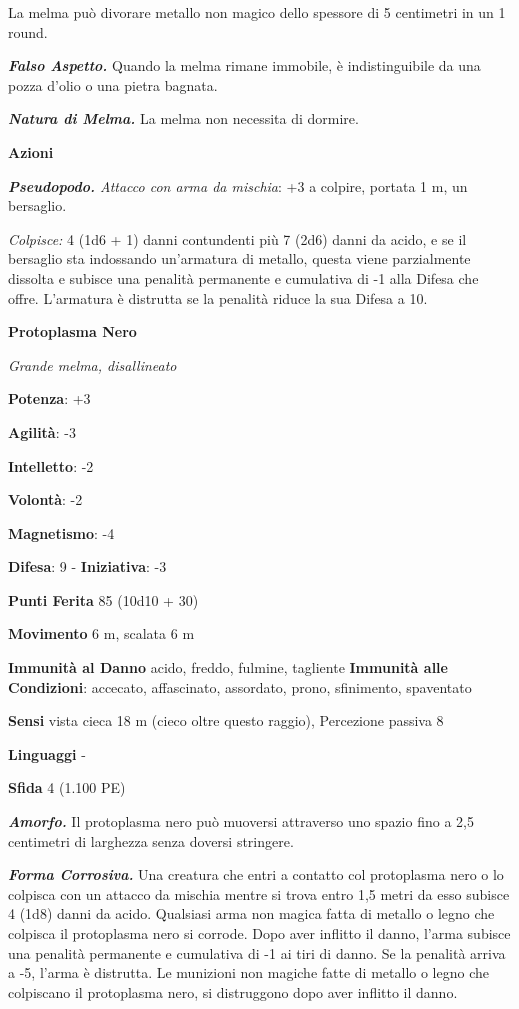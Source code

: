 \begin{multicols}{2}
La melma può divorare metallo non magico dello spessore di 5 centimetri
in un 1 round.

\emph{\textbf{Falso Aspetto.}} Quando la melma rimane immobile, è
indistinguibile da una pozza d'olio o una pietra bagnata.

\emph{\textbf{Natura di Melma.}} La melma non necessita di dormire.

\smallskip\textbf{Azioni}

\emph{\textbf{Pseudopodo.} Attacco con arma da mischia}: +3 a colpire,
portata 1 m, un bersaglio.

\emph{Colpisce:} 4 (1d6 + 1) danni contundenti più 7 (2d6) danni da
acido, e se il bersaglio sta indossando un'armatura di metallo, questa
viene parzialmente dissolta e subisce una penalità permanente e
cumulativa di -1 alla Difesa che offre. L'armatura è distrutta se la
penalità riduce la sua Difesa a 10.



\textbf{Protoplasma Nero}

\emph{Grande melma, disallineato}

\textbf{Potenza}: +3

\textbf{Agilità}: -3

\textbf{Intelletto}: -2

\textbf{Volontà}: -2

\textbf{Magnetismo}: -4

\textbf{Difesa}: 9 - \textbf{Iniziativa}: -3

\textbf{Punti Ferita} 85 (10d10 + 30)

\textbf{Movimento} 6 m, scalata 6 m

\textbf{Immunità al Danno} acido, freddo, fulmine, tagliente
\textbf{Immunità alle Condizioni}: accecato, affascinato, assordato,
prono, sfinimento, spaventato

\textbf{Sensi} vista cieca 18 m (cieco oltre questo raggio), Percezione
passiva 8

\textbf{Linguaggi} -

\textbf{Sfida} 4 (1.100 PE)\smallskip

\emph{\textbf{Amorfo.}} Il protoplasma nero può muoversi attraverso uno
spazio fino a 2,5 centimetri di larghezza senza doversi stringere.

\emph{\textbf{Forma Corrosiva.}} Una creatura che entri a contatto col
protoplasma nero o lo colpisca con un attacco da mischia mentre si trova
entro 1,5 metri da esso subisce 4 (1d8) danni da acido. Qualsiasi arma
non magica fatta di metallo o legno che colpisca il protoplasma nero si
corrode. Dopo aver inflitto il danno, l'arma subisce una penalità
permanente e cumulativa di -1 ai tiri di danno. Se la penalità arriva a
-5, l'arma è distrutta. Le munizioni non magiche fatte di metallo o
legno che colpiscano il protoplasma nero, si distruggono dopo aver
inflitto il danno.


\end{multicols}
